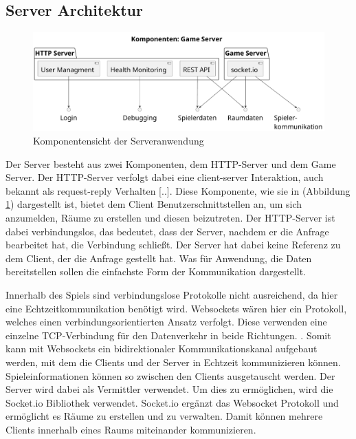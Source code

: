 \documentclass[
]{article}
\begin{document}
\subsection{Server Architektur}
\begin{figure}[H]
	\centering
	\includegraphics[width=\textwidth ]{resources/game_server.pdf}
	\caption{Komponentensicht der Serveranwendung}
	\label{fig:server}
\end{figure}

Der Server besteht aus zwei Komponenten, dem HTTP-Server und dem Game Server.
Der HTTP-Server verfolgt dabei eine \glqq  [..] client-server Interaktion, auch bekannt als 
request-reply Verhalten [..]\grqq{}\cite[S.37 ff.]{tanenbaum2007distributed}.
Diese Komponente, wie sie in (Abbildung \ref{fig:server}) dargestellt ist,
bietet dem Client Benutzerschnittstellen an, um sich anzumelden, Räume zu erstellen und diesen beizutreten.
Der HTTP-Server ist dabei verbindungslos, das bedeutet, 
dass der Server, nachdem er die Anfrage bearbeitet hat, die Verbindung schließt.
Der Server hat dabei keine Referenz zu dem Client, der die Anfrage gestellt hat.
Was für Anwendung, die Daten bereitstellen sollen die einfachste Form der Kommunikation dargestellt.

Innerhalb des Spiels sind verbindungslose Protokolle nicht ausreichend, da hier eine Echtzeitkommunikation benötigt wird.
Websockets wären hier ein Protokoll, welches einen verbindungsorientierten Ansatz verfolgt.
Diese \glqq [..] verwenden eine einzelne TCP-Verbindung für den Datenverkehr in beide Richtungen. 
\grqq{} \cite[Kapitel 1.1]{rfc-websocket}.
Somit kann mit Websockets ein bidirektionaler Kommunikationskanal aufgebaut werden, mit dem die Clients 
und der Server in Echtzeit kommunizieren können.
Spieleinformationen können so zwischen den Clients ausgetauscht werden. 
Der Server wird dabei als Vermittler verwendet. Um dies zu ermöglichen, wird die Socket.io Bibliothek verwendet.
Socket.io ergänzt das Websocket Protokoll und ermöglicht es Räume zu erstellen und zu verwalten.
Damit können mehrere Clients innerhalb eines Raums miteinander kommunizieren.
\end{document}
